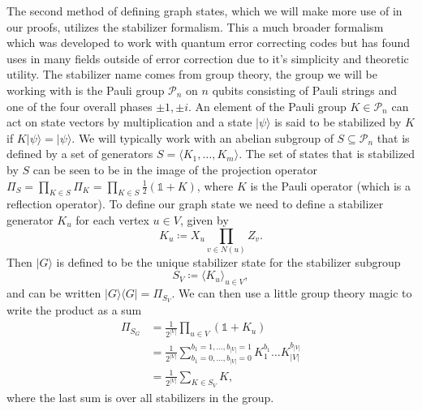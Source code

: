 \documentclass{article}
\newcommand{\ket}[1]{|#1\rangle}
\newcommand{\ketbra}[2]{| #1\rangle\! \langle #2|}
\newcommand{\identity}{\mathds{1}}
\begin{document}
The second method of defining graph states, which we will make more use of in our proofs, utilizes the stabilizer formalism. This a much broader formalism which was developed to work with quantum error correcting codes but has found uses in many fields outside of error correction due to it's simplicity and theoretic utility. The stabilizer name comes from group theory, the group we will be working with is the Pauli group $\mathcal{P}_n$ on $n$ qubits consisting of Pauli strings and one of the four overall phases $\pm 1, \pm i$. An element of the Pauli group $K \in \mathcal{P}_n$ can act on state vectors by multiplication and a state $\ket{\psi}$ is said to be stabilized by $K$ if $K \ket{\psi} = \ket{\psi}$. We will typically work with an abelian subgroup of $S \subseteq \mathcal{P}_n$ that is defined by a set of generators $S = \langle K_1, \ldots, K_m \rangle$. The set of states that is stabilized by $S$ can be seen to be in the image of the projection operator $\Pi_S = \prod_{K \in S} \Pi_K = \prod_{K \in S} \frac{1}{2}(\identity + K)$, where $K$ is the Pauli operator (which is a reflection operator). To define our graph state we need to define a stabilizer generator $K_u$ for each vertex $u \in V$, given by
\begin{equation}
    K_u \coloneqq X_u \prod_{v \in N(u)} Z_{v}.
\end{equation}
Then $\ket{G}$ is defined to be the unique stabilizer state for the stabilizer subgroup 
\begin{equation}
    S_V \coloneqq \langle K_u \rangle_{u \in V},
\end{equation}
and can be written $\ketbra{G}{G} = \Pi_{S_V}$. We can then use a little group theory magic to write the product as a sum
\begin{align}
    \Pi_{S_G} &= \frac{1}{2^{|V|}} \prod_{u \in V} (\identity + K_u) \\
    &= \frac{1}{2^{|V|}} \sum_{b_1 = 0, \ldots, b_{|V|} = 0}^{b_1 = 1, \ldots, b_{|V|} = 1} K_1^{b_1} \ldots K_{|V|}^{b_{|V|}} \\
    &= \frac{1}{2^{|V|}} \sum_{K \in S_{V}} K,
\end{align}
where the last sum is over all stabilizers in the group.
\end{document}
